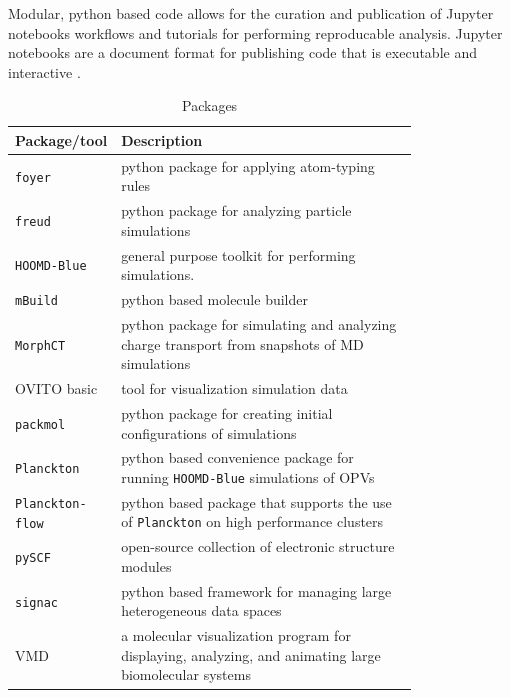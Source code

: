 Modular, python based code allows for the curation and publication of Jupyter notebooks workflows and
tutorials for performing reproducable analysis. Jupyter notebooks are a document format for publishing code
that is executable and interactive \cite{Kluyver2016}. 

 

\begin{table}[]
    \caption{Packages} %
\centering %
\begin{tabular}{|l|p{0.8\linewidth}|} %
\hline\hline %
Package/tool & Description \\ [0.5ex] %
\hline %
    \texttt{foyer} & python package for applying atom-typing rules  \cite{Klein2018a}\\ [1ex] %
\texttt{freud} & python package for analyzing particle simulations  \cite{Ramasubramani2020}\\ [1ex] %
\texttt{HOOMD-Blue} & general purpose toolkit for performing simulations.   \cite{Anderson2020a}\\ [1ex] %
    \texttt{mBuild} & python based molecule builder \cite{Klein2018a}\\ [1ex] %
\texttt{MorphCT} & python package for simulating and analyzing charge transport from 
    snapshots of MD simulations \cite{Jones2017}\cite{cmelab}\\[1ex] 
OVITO basic & tool for visualization simulation data \cite{Stukowski2010a}\\[1ex] 
\texttt{packmol} & python package for creating initial configurations of simulations \cite{Martinez2009}\\[1ex] 
\texttt{Planckton} & python based convenience package for running \texttt{HOOMD-Blue}
    simulations of OPVs \cite{cmelab}\\[1ex]
    \texttt{Planckton-flow} & python based package that supports the use of \texttt{Planckton} on
    high performance clusters\cite{cmelab}\\[1ex]
\texttt{pySCF} & open-source collection of electronic structure modules \cite{Sun2018a}\\[1ex]
\texttt{signac} & python based framework for managing large heterogeneous data spaces \cite{Adorf2016}\\[1ex]
VMD & a molecular visualization program for displaying, analyzing, and animating large biomolecular
    systems \cite{Humphrey1996}\\


\hline %
\end{tabular}
\label{packages} %
\end{table}

